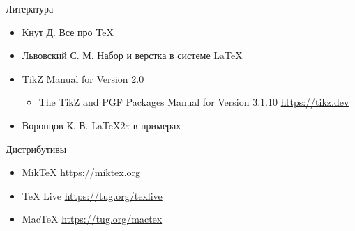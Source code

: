 \documentclass[10pt,aspectratio=169]{beamer}
\begin{document}
    \begin{frame}{Литература}
    	\begin{itemize}
    		\item Кнут Д. Все про \TeX
    		\item Львовский С. М. Набор и верстка в системе \LaTeX
    		\item TikZ Manual for Version 2.0
    		\begin{itemize}
    			\item The TikZ and PGF Packages Manual for Version 3.1.10 \url{https://tikz.dev}
    		\end{itemize}
    		\item Воронцов К. В. \LaTeX $2{\varepsilon}$ в примерах
    	\end{itemize}
    \end{frame}
    
    \begin{frame}{Дистрибутивы}
    	\begin{itemize}
    		\item MikTeX \url{https://miktex.org}
    		\item TeX Live \url{https://tug.org/texlive}
    		\item MacTeX \url{https://tug.org/mactex}
    	\end{itemize}
    \end{frame}
    
\end{document}
